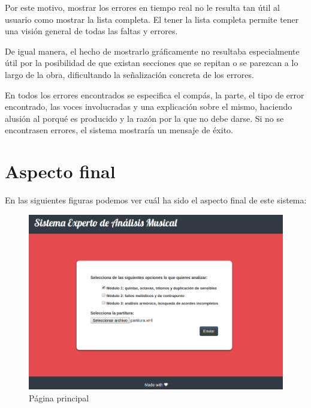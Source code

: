 Por este motivo, mostrar los errores en tiempo real no le resulta tan útil al usuario como mostrar la lista completa. El tener la lista completa permite tener una visión general de todas las faltas y errores. 

De igual manera, el hecho de mostrarlo gráficamente no resultaba especialmente útil por la posibilidad de que existan secciones que se repitan o se parezcan a lo largo de la obra, dificultando la señalización concreta de los errores. 

En todos los errores encontrados se especifica el compás, la parte, el tipo de error encontrado, las voces involucradas y una explicación sobre el mismo, haciendo alusión al porqué es producido y la razón por la que no debe darse. Si no se encontrasen errores, el sistema mostraría un mensaje de éxito.

\section{Aspecto final}

En las siguientes figuras podemos ver cuál ha sido el aspecto final de este sistema:

\bigskip

\begin{figure}[H]
	\centering
	\includegraphics[scale=0.35]{imagenes/interfaz3.png}
	\caption{Página principal}
	\label{fig5.3.1}
\end{figure}

